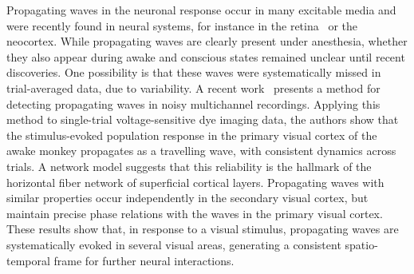 \documentclass[brainsci, %
               review,submit,pdftex,moreauthors
               ]{Definitions/mdpi}
\begin{document}
Propagating waves in the neuronal response occur in many excitable media and were recently found in neural systems, for instance in the retina~\citep{feller_dynamic_1997} or the neocortex. While propagating waves are clearly present under anesthesia, whether they also appear during awake and conscious states remained unclear until recent discoveries. One possibility is that these waves were systematically missed in trial-averaged data, due to variability. A recent work~\citep{muller_stimulus-evoked_2014} presents a method for detecting propagating waves in noisy multichannel recordings. Applying this method to single-trial voltage-sensitive dye imaging data, the authors show that the stimulus-evoked population response in the primary visual cortex of the awake monkey propagates as a travelling wave, with consistent dynamics across trials. A network model suggests that this reliability is the hallmark of the horizontal fiber network of superficial cortical layers. Propagating waves with similar properties occur independently in the secondary visual cortex, but maintain precise phase relations with the waves in the primary visual cortex. These results show that, in response to a visual stimulus, propagating waves are systematically evoked in several visual areas, generating a consistent spatio-temporal frame for further neural interactions.
\end{document}
